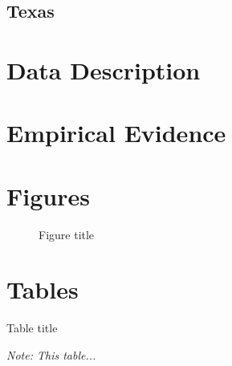 \documentclass[12pt]{article}
\begin{document}
\subsection{Texas}

\section{Data Description}

\section{Empirical Evidence}

\section{Figures}

\begin{figure}[tbh]
	\caption{Figure title}\label{fig1}
\end{figure}

\section{Tables}

\begin{table}[tbh]
    \caption{Table title}
    \label{table1}
        \begin{center}
        \end{center}
    \textit{\scriptsize{}Note: This table...}{\scriptsize \par}
    \end{table}
\end{document}
